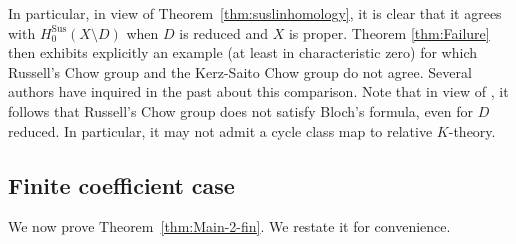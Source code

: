 \documentclass[JEP,XML,SOM,Unicode,published]{cedram}
\newcommand{\sus}{\mathrm{Sus}}
\theoremstyle{definition}
\newcommand{\thmref}{Theorem~\ref}
\begin{document}
In particular, in view of \thmref{thm:suslinhomology}, it is clear that it agrees with \hbox{$H_0^{\sus}(X\!\setminus\!D)$} when $D$ is reduced and $X$ is proper. Theorem \ref{thm:Failure} then exhibits explicitly an example
(at least in characteristic zero)
for which Russell's Chow group and the Kerz-Saito Chow group do not agree.
Several authors have inquired in the past about this comparison.
Note that in view of \cite[Th.\,1.1]{BKS}, it follows that Russell's Chow group does not satisfy Bloch's formula, even for $D$ reduced. In particular,
it may not admit a cycle class map to relative $K$-theory.

\subsection{Finite coefficient case}\label{sec:Main2-III}
We now prove \thmref{thm:Main-2-fin}. We restate it for convenience.
\end{document}
